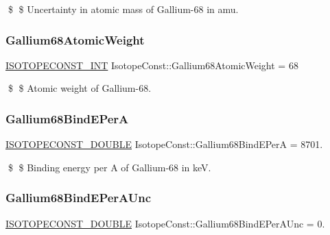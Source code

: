 \$ \$ Uncertainty in atomic mass of Gallium-\/68 in amu. \mbox{\label{group___isotope_const-_gallium-_ga68_ga995aa2aeb1ea8ac89371cfdd6b2c2380}} 
\subsubsection{\texorpdfstring{Gallium68\+Atomic\+Weight}{Gallium68AtomicWeight}}
{\footnotesize\ttfamily \mbox{\hyperlink{group___isotope_const-_macros_ga5f18360b3e99483a35c32d789e62621c}{I\+S\+O\+T\+O\+P\+E\+C\+O\+N\+S\+T\+\_\+\+I\+NT}} Isotope\+Const\+::\+Gallium68\+Atomic\+Weight = 68}

\$ \$ Atomic weight of Gallium-\/68. \mbox{\label{group___isotope_const-_gallium-_ga68_ga37334016283baba10c2540b935dda499}} 
\subsubsection{\texorpdfstring{Gallium68\+Bind\+E\+PerA}{Gallium68BindEPerA}}
{\footnotesize\ttfamily \mbox{\hyperlink{group___isotope_const-_macros_ga8f45a7272ce02c0b4c65c44636ed719a}{I\+S\+O\+T\+O\+P\+E\+C\+O\+N\+S\+T\+\_\+\+D\+O\+U\+B\+LE}} Isotope\+Const\+::\+Gallium68\+Bind\+E\+PerA = 8701.}

\$ \$ Binding energy per A of Gallium-\/68 in keV. \mbox{\label{group___isotope_const-_gallium-_ga68_gad4f863a6a96e825296fb8f3e9fd26577}} 
\subsubsection{\texorpdfstring{Gallium68\+Bind\+E\+Per\+A\+Unc}{Gallium68BindEPerAUnc}}
{\footnotesize\ttfamily \mbox{\hyperlink{group___isotope_const-_macros_ga8f45a7272ce02c0b4c65c44636ed719a}{I\+S\+O\+T\+O\+P\+E\+C\+O\+N\+S\+T\+\_\+\+D\+O\+U\+B\+LE}} Isotope\+Const\+::\+Gallium68\+Bind\+E\+Per\+A\+Unc = 0.}

